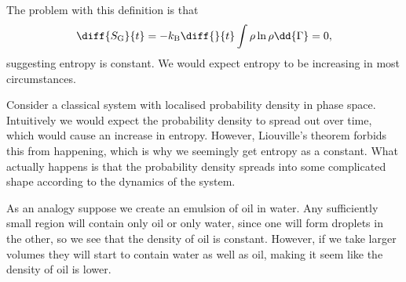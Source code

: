 \documentclass[fleqn]{NotesClass}
\newcommand*{\boltzmann}{k_{\mathrm{B}}}
\begin{document}
    The problem with this definition is that
    \begin{equation}
        \diff{S_{\mathrm{G}}}{t} = -\boltzmann\diff{}{t} \int \rho\ln\rho \dd{\Gamma} = 0,
    \end{equation}
    suggesting entropy is constant.
    We would expect entropy to be increasing in most circumstances.
    
    Consider a classical system with localised probability density in phase space.
    Intuitively we would expect the probability density to spread out over time, which would cause an increase in entropy.
    However, Liouville's theorem forbids this from happening, which is why we seemingly get entropy as a constant.
    What actually happens is that the probability density spreads into some complicated shape according to the dynamics of the system.
    
    As an analogy suppose we create an emulsion of oil in water.
    Any sufficiently small region will contain only oil or only water, since one will form droplets in the other, so we see that the density of oil is constant.
    However, if we take larger volumes they will start to contain water as well as oil, making it seem like the density of oil is lower.
    
\end{document}
